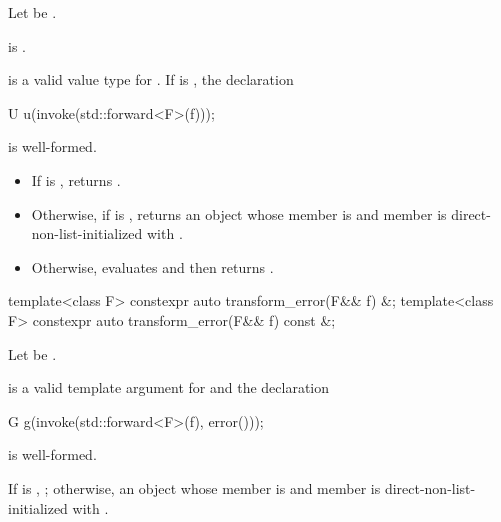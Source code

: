 \begin{itemdescr}
\pnum
Let  be .

\pnum
\constraints
{} is .

\pnum
\mandates
{} is a valid value type for . If  is
, the declaration
\begin{codeblock}
U u(invoke(std::forward<F>(f)));
\end{codeblock}
is well-formed.

\pnum
\effects
\begin{itemize}
\item
If  is , returns
.
\item
Otherwise, if  is , returns an
 object whose  member is  and
 member is direct-non-list-initialized with
.
\item
Otherwise, evaluates  and then returns
.
\end{itemize}
\end{itemdescr}

%
\begin{itemdecl}
template<class F> constexpr auto transform_error(F&& f) &;
template<class F> constexpr auto transform_error(F&& f) const &;
\end{itemdecl}

\begin{itemdescr}
\pnum
Let  be .

\pnum
\mandates
{} is a valid template argument
for  and the declaration
\begin{codeblock}
G g(invoke(std::forward<F>(f), error()));
\end{codeblock}
is well-formed.

\pnum
\returns
If  is , ; otherwise, an
 object whose  member is 
and  member is direct-non-list-initialized with
.
\end{itemdescr}

